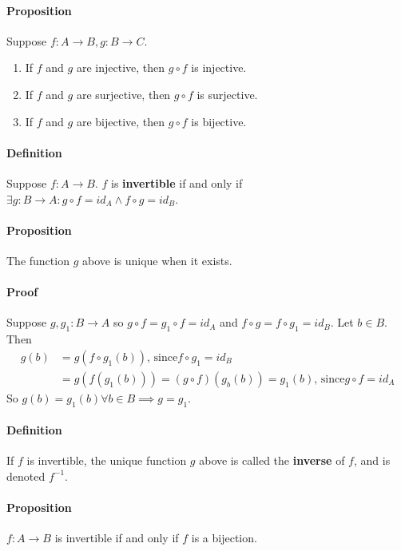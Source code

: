 \documentclass{article}
\newcommand{\mapab}[2]{{#1}\xrightarrow{}{#2}}
\begin{document}
	\paragraph{Proposition}
	Suppose $f:\mapab{A}{B}, g:\mapab{B}{C}$.
	\begin{enumerate}[label=\alph*)]
		\item If $f$ and $g$ are injective, then $g\circ f$ is injective.\\
		\item If $f$ and $g$ are surjective, then $g\circ f$ is surjective.\\
		\item If $f$ and $g$ are bijective, then $g\circ f$ is bijective.
	\end{enumerate}
	\paragraph{Definition}
	Suppose $f:\mapab{A}{B}$. $f$ is \textbf{invertible} if and only if $\exists g:\mapab{B}{A} : g\circ f = id_A \land f\circ g = id_B$.
	\paragraph{Proposition}
	The function $g$ above is unique when it exists.
	\paragraph{Proof}
	Suppose $g,g_1:\mapab{B}{A}$ so $g\circ f = g_1\circ f = id_A$ and $f\circ g = f\circ g_1 = id_B$. Let $b\in B$. Then
	\begin{align*}
	g(b) &= g(f\circ g_1(b))\textrm{, since} f\circ g_1=id_B\\
	&=g(f(g_1(b))) = (g\circ f)(g_b(b)) = g_1(b)\textrm{, since} g\circ f = id_A
	\end{align*}
	So $g(b)=g_1(b)\forall b\in B\implies g=g_1$.
	\paragraph{Definition}
	If $f$ is invertible, the unique function $g$ above is called the \textbf{inverse} of $f$, and is denoted $f^{-1}$.
	\paragraph{Proposition}
	$f:\mapab{A}{B}$ is invertible if and only if $f$ is a bijection.
\end{document}
